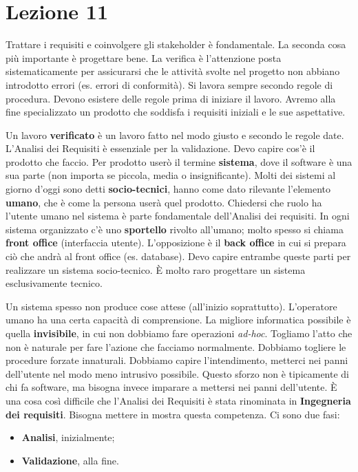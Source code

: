 \section{Lezione 11}

Trattare i requisiti e coinvolgere gli stakeholder è fondamentale. La seconda cosa più importante è progettare bene. La verifica è l'attenzione posta sistematicamente per assicurarsi che le attività svolte nel progetto non abbiano introdotto errori (es. errori di conformità). Si lavora sempre secondo regole di procedura. Devono esistere delle regole prima di iniziare il lavoro. Avremo alla fine specializzato un prodotto che soddisfa i requisiti iniziali e le sue aspettative. 

Un lavoro \textbf{verificato} è un lavoro fatto nel modo giusto e secondo le regole date. L'Analisi dei Requisiti è essenziale per la validazione. Devo capire cos'è il prodotto che faccio. Per prodotto userò il termine \textbf{sistema}, dove il software è una sua parte (non importa se piccola, media o insignificante). Molti dei sistemi al giorno d'oggi sono detti \textbf{socio-tecnici}, hanno come dato rilevante l'elemento \textbf{umano}, che è come la persona userà quel prodotto. Chiedersi che ruolo ha l'utente umano nel sistema è parte fondamentale dell'Analisi dei requisiti. In ogni sistema organizzato c'è uno \textbf{sportello} rivolto all'umano; molto spesso si chiama \textbf{front office} (interfaccia utente). L'opposizione è il \textbf{back office} in cui si prepara ciò che andrà al front office (es. database). Devo capire entrambe queste parti per realizzare un sistema socio-tecnico. È molto raro progettare un sistema esclusivamente tecnico. 

Un sistema spesso non produce cose attese (all'inizio soprattutto). L'operatore umano ha una certa capacità di comprensione. La migliore informatica possibile è quella \textbf{invisibile}, in cui non dobbiamo fare operazioni \textit{ad-hoc}. Togliamo l'atto che non è naturale per fare l'azione che facciamo normalmente. Dobbiamo togliere le procedure forzate innaturali. Dobbiamo capire l'intendimento, metterci nei panni dell'utente nel modo meno intrusivo possibile. Questo sforzo non è tipicamente di chi fa software, ma bisogna invece imparare a mettersi nei panni dell'utente. È una cosa così difficile che l'Analisi dei Requisiti è stata rinominata in \textbf{Ingegneria dei requisiti}. Bisogna mettere in mostra questa competenza. Ci sono due fasi:

\begin{itemize}

	\item \textbf{Analisi}, inizialmente;
	\item \textbf{Validazione}, alla fine.

\end{itemize}

